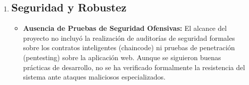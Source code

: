 \begin{enumerate}
    \item \subsection{Seguridad y Robustez}
    \begin{itemize}
        \item \textbf{Ausencia de Pruebas de Seguridad Ofensivas:} El alcance del proyecto no incluyó la realización de auditorías de seguridad formales sobre los contratos inteligentes (chaincode) ni pruebas de penetración (pentesting) sobre la aplicación web. Aunque se siguieron buenas prácticas de desarrollo, no se ha verificado formalmente la resistencia del sistema ante ataques maliciosos especializados.
    \end{itemize}
\end{enumerate}